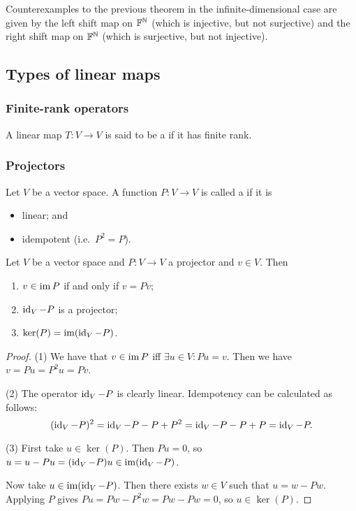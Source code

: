 \begin{example}
Counterexamples to the previous theorem in the infinite-dimensional case are given by the left shift map on $\mathbb{F}^{\mathbb{N}}$ (which is injective, but not surjective) and the right shift map on $\mathbb{F}^{\mathbb{N}}$ (which is surjective, but not injective).
\end{example}

\subsection{Types of linear maps}
\subsubsection{Finite-rank operators}
\begin{definition}
A linear map $T: V\to V$ is said to be a  if it has finite rank.
\end{definition}

\subsubsection{Projectors}
\begin{definition}
Let $V$ be a vector space. A function $P: V\to V$ is called a  if it is
\begin{itemize}
\item linear; and
\item idempotent (i.e.\ $P^2 = P$).
\end{itemize}
\end{definition}

\begin{lemma} \label{projectorKernelImageLemma}
Let $V$ be a vector space and $P:V\to V$ a projector and $v\in V$. Then
\begin{enumerate}
\item $v\in \operatorname{im} P$ \textup{if and only if} $v = Pv$;
\item $\operatorname{id}_V - P$ is a projector;
\item $\ker(P) = \operatorname{im}(\operatorname{id}_V - P)$.
\end{enumerate}
\end{lemma}
\begin{proof}
(1) We have that $v\in \operatorname{im} P$ iff $\exists u\in V: Pu = v$. Then we have $v = Pu = P^2u = Pv$.

(2) The operator $\operatorname{id}_V - P$ is clearly linear. Idempotency can be calculated as follows:
\[ (\operatorname{id}_V - P)^2 = \operatorname{id}_V - P -P + P^2 = \operatorname{id}_V - P -P + P = \operatorname{id}_V - P. \]

(3) First take $u\in \ker(P)$. Then $Pu = 0$, so $u = u - Pu = (\operatorname{id}_V - P)u \in \operatorname{im}(\operatorname{id}_V - P)$.

Now take $u\in \operatorname{im}(\operatorname{id}_V - P)$. Then there exists $w\in V$ such that $u = w - Pw$. Applying $P$ gives $Pu = Pw - P^2w = Pw-Pw = 0$, so $u\in \ker(P)$.
\end{proof}

